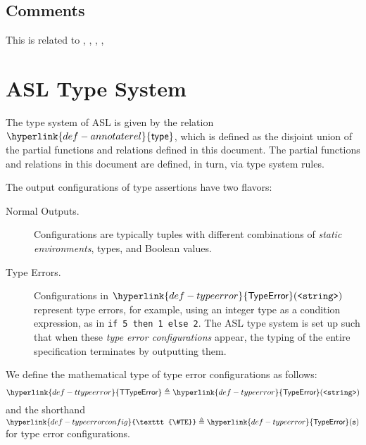 \documentclass{book}
\newcommand\TypeError[0]{\hyperlink{def-typeerror}{\textsf{TypeError}}}
\newcommand\TTypeError[0]{\hyperlink{def-ttypeerror}{\textsf{TTypeError}}}
\newcommand\TypeErrorConfig[0]{\hyperlink{def-typeerrorconfig}{\texttt{\#TE}}}
\newcommand\annotaterel[0]{\hyperlink{def-annotaterel}{\textsf{type}}}
\newcommand\annotatestmt[1]{\texttt{annotate\_stmt}(#1)}
\newcommand\tenvone[0]{\texttt{tenv1}}
\newcommand\tenvtwo[0]{\texttt{tenv2}}
\newcommand\vs[0]{\texttt{s}}
\newcommand\vsone[0]{\texttt{s1}}
\newcommand\vstwo[0]{\texttt{s2}}
\newcommand\newsone[0]{\texttt{new\_s1}}
\newcommand\newstwo[0]{\texttt{new\_s2}}
\begin{document}
\subsection{Comments}
    This is related to , , , , 

\section{ASL Type System}
\hypertarget{def-annotaterel}{}
The type system of ASL is given by the relation $\annotaterel$, which is defined as the disjoint union
of the partial functions and relations defined in this document.
The partial functions and relations in this document are defined, in turn, via type system rules.

The output configurations of type assertions have two flavors:
\begin{description}
  \item[Normal Outputs.] \hypertarget{def-normal-type-outputs}{}
  Configurations are typically tuples with different combinations
  of \emph{static environments}, types, and Boolean values.

  \hypertarget{def-typeerror}{}
  \item[Type Errors.] Configurations in $\TypeError(\texttt{<string>})$
  represent type errors, for example, using an integer type as a condition expression, as in \verb|if 5 then 1 else 2|.
  The ASL type system is set up such that when these \emph{type error configurations} appear,
  the typing of the entire specification terminates by outputting them.
\end{description}

We define the mathematical type of type error configurations as follows:
\hypertarget{def-ttypeerror}{}
\[
  \TTypeError \triangleq \TypeError(\texttt{<string>})
\]
\hypertarget{def-typeerrorconfig}{}
and the shorthand $\TypeErrorConfig \triangleq \TypeError(\vs)$ for type error configurations.

\end{document}

